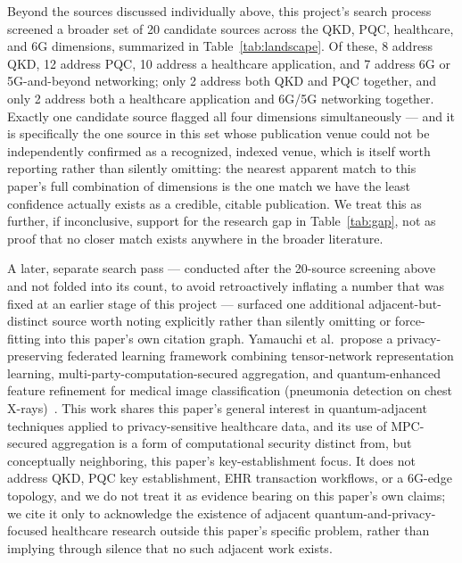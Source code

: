 \documentclass[journal]{IEEEtran}
\begin{document}
Beyond the sources discussed individually above, this project's search process screened a broader set of 20 candidate sources across the QKD, PQC, healthcare, and 6G dimensions, summarized in Table~\ref{tab:landscape}. Of these, 8 address QKD, 12 address PQC, 10 address a healthcare application, and 7 address 6G or 5G-and-beyond networking; only 2 address both QKD and PQC together, and only 2 address both a healthcare application and 6G/5G networking together. Exactly one candidate source flagged all four dimensions simultaneously --- and it is specifically the one source in this set whose publication venue could not be independently confirmed as a recognized, indexed venue, which is itself worth reporting rather than silently omitting: the nearest apparent match to this paper's full combination of dimensions is the one match we have the least confidence actually exists as a credible, citable publication. We treat this as further, if inconclusive, support for the research gap in Table~\ref{tab:gap}, not as proof that no closer match exists anywhere in the broader literature.

A later, separate search pass --- conducted after the 20-source screening above and not folded into its count, to avoid retroactively inflating a number that was fixed at an earlier stage of this project --- surfaced one additional adjacent-but-distinct source worth noting explicitly rather than silently omitting or force-fitting into this paper's own citation graph. Yamauchi et al.\ propose a privacy-preserving federated learning framework combining tensor-network representation learning, multi-party-computation-secured aggregation, and quantum-enhanced feature refinement for medical image classification (pneumonia detection on chest X-rays)~\cite{yamauchi2026tensorqml}. This work shares this paper's general interest in quantum-adjacent techniques applied to privacy-sensitive healthcare data, and its use of MPC-secured aggregation is a form of computational security distinct from, but conceptually neighboring, this paper's key-establishment focus. It does not address QKD, PQC key establishment, EHR transaction workflows, or a 6G-edge topology, and we do not treat it as evidence bearing on this paper's own claims; we cite it only to acknowledge the existence of adjacent quantum-and-privacy-focused healthcare research outside this paper's specific problem, rather than implying through silence that no such adjacent work exists.
\end{document}
